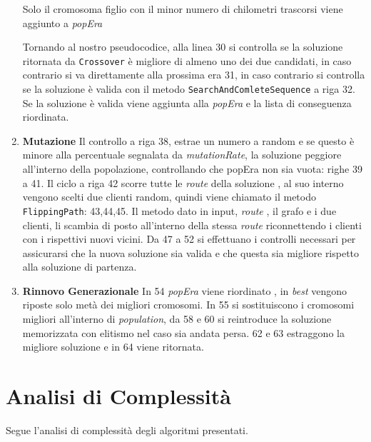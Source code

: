 \documentclass[]{article}
\begin{document}
\begin{enumerate}
Solo il cromosoma figlio con il minor numero di chilometri trascorsi viene aggiunto a \textit{popEra} 


Tornando al nostro pseudocodice, alla linea 30 si controlla se la soluzione ritornata da \texttt{Crossover} è migliore di almeno uno dei due candidati, in caso contrario si va direttamente alla prossima era 31, in caso contrario si controlla se la soluzione è valida  con il metodo \texttt{SearchAndComleteSequence} a riga 32. Se la soluzione è valida viene aggiunta alla \textit{popEra} e la lista di conseguenza riordinata.

\item \textbf{Mutazione}
Il controllo a riga 38, estrae un numero a random e se questo è minore alla percentuale segnalata da \textit{mutationRate}, la soluzione peggiore all'interno della popolazione, controllando che popEra non sia vuota: righe 39 a 41. Il ciclo a riga 42 scorre tutte le \emph{route} della soluzione , al suo interno vengono scelti due clienti random, quindi viene chiamato il metodo \texttt{FlippingPath}: 43,44,45.
Il metodo dato in input, \emph{route} , il grafo e i due clienti, li scambia di posto all'interno della stessa \emph{route} riconnettendo i clienti con i rispettivi nuovi vicini. Da 47 a 52 si effettuano i controlli necessari per assicurarsi che la nuova soluzione sia valida e che questa sia migliore rispetto alla soluzione di partenza.

\item \textbf{Rinnovo Generazionale}
In 54 \textit{popEra} viene riordinato , in \textit{best} vengono riposte solo metà dei migliori cromosomi. In 55 si sostituiscono i cromosomi migliori all'interno di \textit{population}, da 58 e 60 si reintroduce la soluzione memorizzata con elitismo nel caso sia andata persa. 62 e 63 estraggono la migliore soluzione e in 64 viene ritornata.

\end{enumerate}

\section{Analisi di Complessità}
Segue l'analisi di complessità degli algoritmi presentati.
\end{document}
